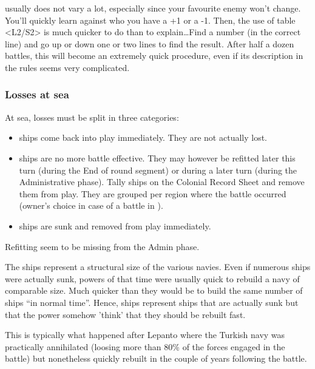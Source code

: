 \begin{designnote}
   usually does not vary a lot, especially since your
  favourite enemy won't change. You'll quickly learn against who you have a +1
  or a -1. Then, the use of table <L2/S2> is much quicker to do than to
  explain\ldots Find a number (in the correct line) and go up or down one or
  two lines to find the result. After half a dozen battles, this will become
  an extremely quick procedure, even if its description in the rules seems
  very complicated.
\end{designnote}

\subsubsection{Losses at sea}
At sea, losses must be split in three categories:
\begin{itemize}
\item {} ships come back into play immediately. They are not
  actually lost.
\item {} ships are no more battle effective. They may however be
  refitted later this turn (during the End of round segment) or during a later
  turn (during the Administrative phase). Tally  ships on the
  Colonial Record Sheet and remove them from play. They are grouped per region
  where the battle occurred (owner's choice in case of a battle in
  \seazoneHorn).
\item {} ships are sunk and removed from play immediately.
\end{itemize}

\begin{todo}
  Refitting seem to be missing from the Admin phase.
\end{todo}

\begin{designnote}
  The  ships represent a structural size of the various
  navies. Even if numerous ships were actually sunk, powers of that time were
  usually quick to rebuild a navy of comparable size. Much quicker than they
  would be to build the same number of ships ``in normal time''. Hence,
   ships represent ships that are actually sunk but that the
  power somehow 'think' that they should be rebuilt fast.

  This is typically what happened after Lepanto where the Turkish navy was
  practically annihilated (loosing more than 80\% of the forces engaged in the
  battle) but nonetheless quickly rebuilt in the couple of years following the
  battle.
\end{designnote}

